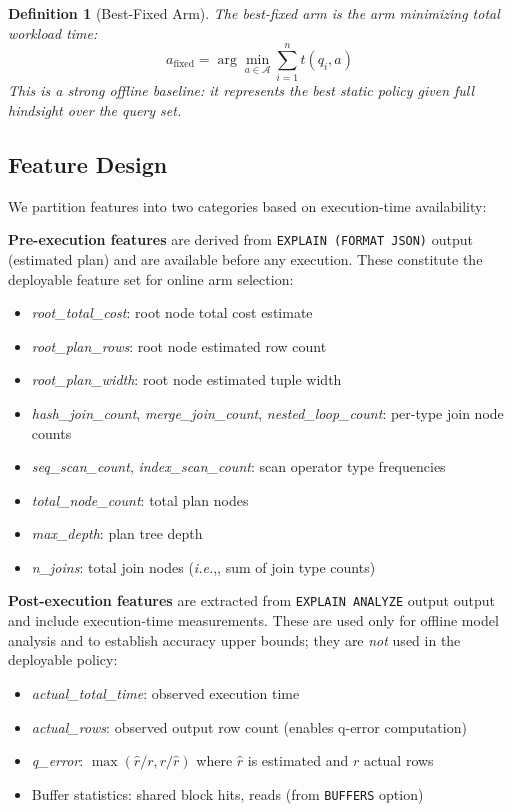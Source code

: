 \documentclass[sigconf,natbib=false]{article}
\newcommand{\feat}[1]{\textit{#1}}
\newcommand{\ie}{\textit{i.e.},}
\newtheorem{definition}{Definition}
\begin{document}
\begin{definition}[Best-Fixed Arm]
The best-fixed arm is the arm minimizing total workload time:
\[
  a_{\mathrm{fixed}} = \arg\min_{a \in \mathcal{A}} \sum_{i=1}^n t(q_i, a)
\]
This is a strong offline baseline: it represents the best static policy given full
hindsight over the query set.
\end{definition}

\subsection{Feature Design}
\label{sec:method:features}

We partition features into two categories based on execution-time availability:

\textbf{Pre-execution features} are derived from \texttt{EXPLAIN (FORMAT JSON)} output
(estimated plan) and are available before any execution. These constitute the deployable
feature set for online arm selection:
\begin{itemize}[noitemsep,topsep=2pt,leftmargin=*]
  \item \feat{root\_total\_cost}: root node total cost estimate
  \item \feat{root\_plan\_rows}: root node estimated row count
  \item \feat{root\_plan\_width}: root node estimated tuple width
  \item \feat{hash\_join\_count}, \feat{merge\_join\_count}, \feat{nested\_loop\_count}: per-type join node counts
  \item \feat{seq\_scan\_count}, \feat{index\_scan\_count}: scan operator type frequencies
  \item \feat{total\_node\_count}: total plan nodes
  \item \feat{max\_depth}: plan tree depth
  \item \feat{n\_joins}: total join nodes (\ie, sum of join type counts)
\end{itemize}

\textbf{Post-execution features} are extracted from \texttt{EXPLAIN ANALYZE} output
output and include execution-time measurements. These are used only for offline model analysis
and to establish accuracy upper bounds; they are \emph{not} used in the deployable policy:
\begin{itemize}[noitemsep,topsep=2pt,leftmargin=*]
  \item \feat{actual\_total\_time}: observed execution time
  \item \feat{actual\_rows}: observed output row count (enables q-error computation)
  \item \feat{q\_error}: $\max(\hat{r}/r, r/\hat{r})$ where $\hat{r}$ is estimated and $r$ actual rows
  \item Buffer statistics: shared block hits, reads (from \texttt{BUFFERS} option)
\end{itemize}
\end{document}
